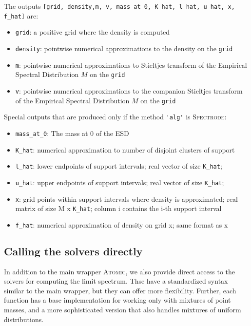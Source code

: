 \documentclass[english,11pt]{article} %
\begin{document}
The outputs \verb+[grid, density,m, v, mass_at_0, K_hat, l_hat, u_hat, x, f_hat]+ are: 

\begin{itemize}
\item \verb+grid+: a positive grid where the density is computed
\item \verb+density+: pointwise numerical approximations to the density on the \verb+grid+
\item \verb+m+: pointwise numerical approximations to Stieltjes transform of the Empirical Spectral Distribution $M$ on the \verb+grid+
\item \verb+v+: pointwise numerical approximations to the companion Stieltjes transform of the Empirical Spectral Distribution $M$ on the \verb+grid+
\end{itemize}

Special outputs that are produced only if the method \verb+'alg'+ is \textsc{Spectrode}: 
\begin{itemize}
\item \verb+mass_at_0+: The mass at 0 of the ESD
\item \verb+K_hat+: numerical approximation to number of disjoint clusters of support
\item \verb+l_hat+: lower endpoints of support intervals; real vector of size \verb+K_hat+;
\item \verb+u_hat+: upper endpoints of support intervals; real vector of size \verb+K_hat+;
\item \verb+x+: grid points within support intervals where density is approximated;
      real matrix of size M x \verb+K_hat+; column i contains the i-th support
     interval
\item \verb+f_hat+: numerical approximation of density on grid x; same format as x
\end{itemize}

\subsection{Calling the solvers directly}

In addition to the main wrapper \textsc{Atomic}, we also provide direct access to the solvers for computing the limit spectrum. Thse have a standardized syntax similar to the main wrapper, but they can offer more flexibility. Further, each function has a base implementation for working only with mixtures of point masses, and a more sophisticated version that also handles mixtures of uniform distributions.
\end{document}
